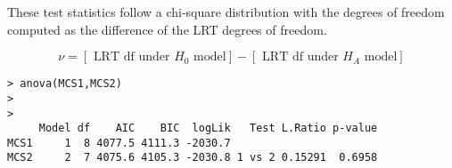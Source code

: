 \documentclass[12pt, a4paper]{report}
\begin{document}
These test statistics follow a chi-square distribution with the degrees of freedom computed as the difference of the LRT degrees of freedom.

\begin{equation}
\nu = [\mbox{ LRT df under }H_{0} \mbox{ model}] - [\mbox{ LRT df under }H_{A} \mbox{ model}]
\end{equation}

\newpage   
\begin{verbatim}
> anova(MCS1,MCS2)
>
>
     Model df    AIC    BIC  logLik   Test L.Ratio p-value
MCS1     1  8 4077.5 4111.3 -2030.7
MCS2     2  7 4075.6 4105.3 -2030.8 1 vs 2 0.15291  0.6958
\end{verbatim}
\end{document}
